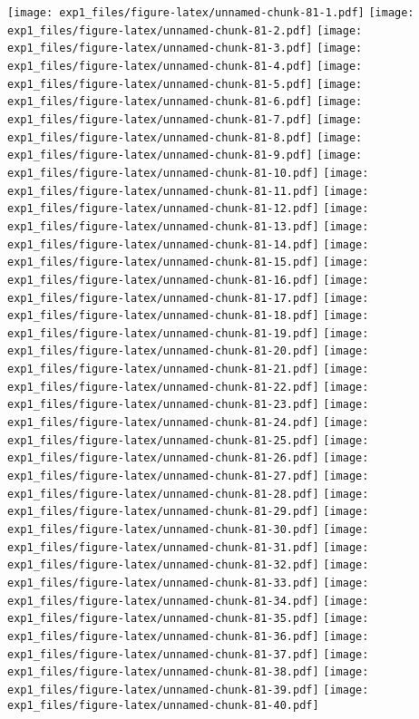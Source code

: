 \documentclass[11pt,,]{article}
\begin{document}
\texttt{[image: exp1\_files/figure-latex/unnamed-chunk-81-1.pdf]}
\texttt{[image: exp1\_files/figure-latex/unnamed-chunk-81-2.pdf]}
\texttt{[image: exp1\_files/figure-latex/unnamed-chunk-81-3.pdf]}
\texttt{[image: exp1\_files/figure-latex/unnamed-chunk-81-4.pdf]}
\texttt{[image: exp1\_files/figure-latex/unnamed-chunk-81-5.pdf]}
\texttt{[image: exp1\_files/figure-latex/unnamed-chunk-81-6.pdf]}
\texttt{[image: exp1\_files/figure-latex/unnamed-chunk-81-7.pdf]}
\texttt{[image: exp1\_files/figure-latex/unnamed-chunk-81-8.pdf]}
\texttt{[image: exp1\_files/figure-latex/unnamed-chunk-81-9.pdf]}
\texttt{[image: exp1\_files/figure-latex/unnamed-chunk-81-10.pdf]}
\texttt{[image: exp1\_files/figure-latex/unnamed-chunk-81-11.pdf]}
\texttt{[image: exp1\_files/figure-latex/unnamed-chunk-81-12.pdf]}
\texttt{[image: exp1\_files/figure-latex/unnamed-chunk-81-13.pdf]}
\texttt{[image: exp1\_files/figure-latex/unnamed-chunk-81-14.pdf]}
\texttt{[image: exp1\_files/figure-latex/unnamed-chunk-81-15.pdf]}
\texttt{[image: exp1\_files/figure-latex/unnamed-chunk-81-16.pdf]}
\texttt{[image: exp1\_files/figure-latex/unnamed-chunk-81-17.pdf]}
\texttt{[image: exp1\_files/figure-latex/unnamed-chunk-81-18.pdf]}
\texttt{[image: exp1\_files/figure-latex/unnamed-chunk-81-19.pdf]}
\texttt{[image: exp1\_files/figure-latex/unnamed-chunk-81-20.pdf]}
\texttt{[image: exp1\_files/figure-latex/unnamed-chunk-81-21.pdf]}
\texttt{[image: exp1\_files/figure-latex/unnamed-chunk-81-22.pdf]}
\texttt{[image: exp1\_files/figure-latex/unnamed-chunk-81-23.pdf]}
\texttt{[image: exp1\_files/figure-latex/unnamed-chunk-81-24.pdf]}
\texttt{[image: exp1\_files/figure-latex/unnamed-chunk-81-25.pdf]}
\texttt{[image: exp1\_files/figure-latex/unnamed-chunk-81-26.pdf]}
\texttt{[image: exp1\_files/figure-latex/unnamed-chunk-81-27.pdf]}
\texttt{[image: exp1\_files/figure-latex/unnamed-chunk-81-28.pdf]}
\texttt{[image: exp1\_files/figure-latex/unnamed-chunk-81-29.pdf]}
\texttt{[image: exp1\_files/figure-latex/unnamed-chunk-81-30.pdf]}
\texttt{[image: exp1\_files/figure-latex/unnamed-chunk-81-31.pdf]}
\texttt{[image: exp1\_files/figure-latex/unnamed-chunk-81-32.pdf]}
\texttt{[image: exp1\_files/figure-latex/unnamed-chunk-81-33.pdf]}
\texttt{[image: exp1\_files/figure-latex/unnamed-chunk-81-34.pdf]}
\texttt{[image: exp1\_files/figure-latex/unnamed-chunk-81-35.pdf]}
\texttt{[image: exp1\_files/figure-latex/unnamed-chunk-81-36.pdf]}
\texttt{[image: exp1\_files/figure-latex/unnamed-chunk-81-37.pdf]}
\texttt{[image: exp1\_files/figure-latex/unnamed-chunk-81-38.pdf]}
\texttt{[image: exp1\_files/figure-latex/unnamed-chunk-81-39.pdf]}
\texttt{[image: exp1\_files/figure-latex/unnamed-chunk-81-40.pdf]}
\end{document}
